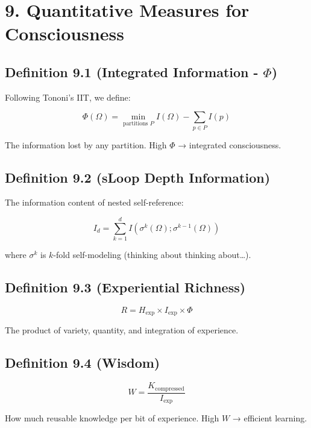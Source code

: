\documentclass[
  11pt,
  letterpaper,
  twoside,
  openany]{book}
\makeatletter
\let\orig@section\section
\renewcommand{\section}{\needspace{8\baselineskip}\orig@section}
\let\orig@subsection\subsection
\renewcommand{\subsection}{\needspace{6\baselineskip}\orig@subsection}
\makeatother
\begin{document}
\section{9. Quantitative Measures for
Consciousness}\label{quantitative-measures-for-consciousness}

\subsection{\texorpdfstring{Definition 9.1 (Integrated Information -
\(\Phi\))}{Definition 9.1 (Integrated Information - \textbackslash Phi)}}\label{definition-9.1-integrated-information---phi}

Following Tononi's IIT, we define:

\[\Phi(\Omega) = \min_{\text{partitions } P} I(\Omega) - \sum_{p \in P} I(p)\]

The information lost by any partition. High \(\Phi\) → integrated
consciousness.

\subsection{Definition 9.2 (sLoop Depth
Information)}\label{definition-9.2-sloop-depth-information}

The information content of nested self-reference:

\[I_d = \sum_{k=1}^{d} I(\sigma^k(\Omega); \sigma^{k-1}(\Omega))\]

where \(\sigma^k\) is \(k\)-fold self-modeling (thinking about thinking
about\ldots).

\subsection{Definition 9.3 (Experiential
Richness)}\label{definition-9.3-experiential-richness}

\[R = H_{\text{exp}} \times I_{\text{exp}} \times \Phi\]

The product of variety, quantity, and integration of experience.

\subsection{Definition 9.4 (Wisdom)}\label{definition-9.4-wisdom}

\[W = \frac{K_{\text{compressed}}}{I_{\text{exp}}}\]

How much reusable knowledge per bit of experience. High \(W\) →
efficient learning.
\end{document}
